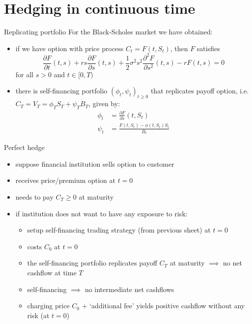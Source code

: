 \documentclass[pdf, handout]{beamer}
\begin{document}
\section{Hedging in continuous time}

\begin{frame}{Replicating portfolio}
For the Black-Scholes market we have obtained:
\begin{itemize}
\item if we have option with price process $C_t=F(t, S_t)$,
then  $F$ satisfies
\[
\frac{\partial F}{\partial t}(t,s) + r s \frac{\partial F}{\partial
s}(t,s) + \frac{1}{2}\sigma^2 s^2 \frac{\partial^2 F}{\partial
s^2}(t,s) -r F(t,s)=0
\]
for all $s>0$ and $t\in[0,T)$
\item there is self-financing portfolio $(\phi_t,\psi_t)_{t\geq 0}$ that replicates payoff option, i.e. $C_T=V_T=\phi_T S_T+ \psi_T B_T$, given by:
\begin{align*}
\phi_t &=\frac{\partial F}{\partial s}(t,S_t) \\
\psi_t &=\frac{F(t, S_t)-\phi(t,S_t) S_t}{B_t}
\end{align*}
\end{itemize}
\end{frame}

\begin{frame}{Perfect hedge}
\begin{itemize}
\item suppose financial institution sells option to customer
\item receives price/premium option at $t=0$
\item needs to pay $C_T\geq 0$ at maturity
\item if institution does not want to have any exposure to risk:
\begin{itemize}
\item setup self-financing trading strategy (from previous sheet) at $t=0$
\item costs $C_0$ at $t=0$
\item the self-financing portfolio replicates payoff $C_T$ at maturity 
$\implies$ no net cashflow at time $T$
\item self-financing $\implies$ no intermediate net cashflows
\item charging price $C_0$ + `additional fee' yields positive cashflow without any risk
(at $t=0$)
\end{itemize}
\end{itemize}
\end{frame}
\end{document}
